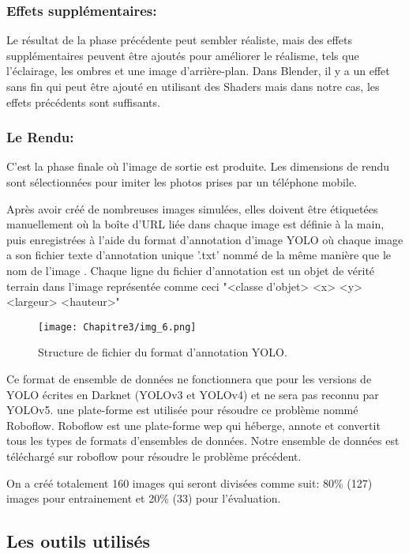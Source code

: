           \subsubsection{Effets supplémentaires:} Le résultat de la phase précédente peut sembler réaliste, mais des effets supplémentaires peuvent être ajoutés pour améliorer le réalisme, tels que l'éclairage, les ombres et une image d'arrière-plan. Dans Blender, il y a un effet sans fin qui peut être ajouté en utilisant des Shaders mais dans notre cas, les effets précédents sont suffisants.
          \subsubsection{Le Rendu:} C'est la phase finale où l'image de sortie est produite. Les dimensions de rendu sont sélectionnées pour imiter les photos prises par un téléphone mobile.
          

          Après avoir créé de nombreuses images simulées, elles doivent être étiquetées manuellement où la boîte d'URL liée dans chaque image est définie à la main, puis enregistrées à l'aide du format d'annotation d'image YOLO où chaque image a son fichier texte d'annotation unique '.txt' nommé de la même manière que le nom de l'image . Chaque ligne du fichier d'annotation est un objet de vérité terrain dans l'image représentée comme ceci "<classe d'objet> <x> <y> <largeur> <hauteur>"
          \begin{figure}[H]
               \centering
               \texttt{[image: Chapitre3/img\_6.png]}
               \caption{Structure de fichier du format d'annotation YOLO.}
               \label{img7}
               \end{figure}

          Ce format de ensemble de données ne fonctionnera que pour les versions de YOLO écrites en Darknet (YOLOv3 et YOLOv4) et ne sera pas reconnu par YOLOv5. une plate-forme est utilisée pour résoudre ce problème nommé Roboflow. Roboflow est une plate-forme wep qui héberge, annote et convertit tous les types de formats d'ensembles de données. Notre ensemble de données est téléchargé sur roboflow pour résoudre le problème précédent.
          
          On a créé totalement 160 images qui seront divisées comme suit: 80\% (127) images pour entrainement et 20\% (33) pour l'évaluation.

          \subsection{Les outils utilisés}
